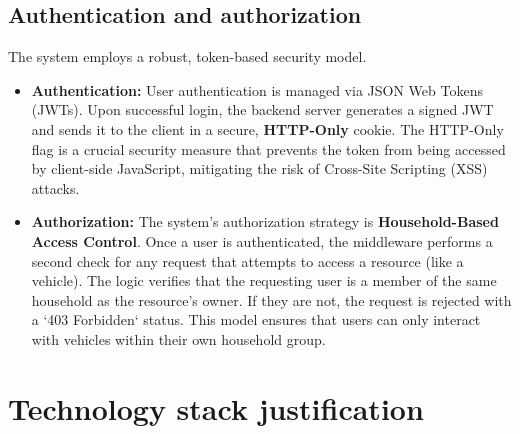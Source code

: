 \subsection{Authentication and authorization}
The system employs a robust, token-based security model.
\begin{itemize}
    \item \textbf{Authentication:} User authentication is managed via JSON Web Tokens (JWTs). Upon successful login, the backend server generates a signed JWT and sends it to the client in a secure, \textbf{HTTP-Only} cookie. The HTTP-Only flag is a crucial security measure that prevents the token from being accessed by client-side JavaScript, mitigating the risk of Cross-Site Scripting (XSS) attacks.
    \textgap
    \item \textbf{Authorization:} The system's authorization strategy is \textbf{Household-Based Access Control}. Once a user is authenticated, the middleware performs a second check for any request that attempts to access a resource (like a vehicle). The logic verifies that the requesting user is a member of the same household as the resource's owner. If they are not, the request is rejected with a `403 Forbidden` status. This model ensures that users can only interact with vehicles within their own household group.
\end{itemize}

\section{Technology stack justification}

